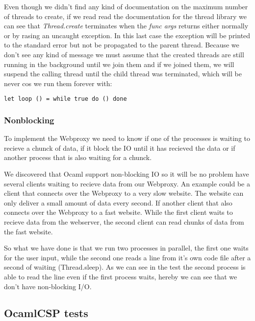 \documentclass[a4paper,12pt]{article}
\begin{document}
Even though we didn't find any kind of documentation on the maximum number
of threads to create, if we read read the documentation for the thread library
we can see that {\it Thread.create} terminates when the {\it func args}
returns either normally or by rasing an uncaught exception. In this last case
the exception will be printed to the standard error but not be propagated to
the parent thread. Because we don't see any kind of message we must assume
that the created threads are still running in the background until we join
them and if we joined them, we will suspend the calling thread until the
child thread was terminated, which will be never cos we run them forever with:
\begin{verbatim}
let loop () = while true do () done
\end{verbatim}

\subsubsection{Nonblocking}
To implement the Webproxy we need to know if one of the processes is waiting
to recieve a chunck of data, if it block the IO until it has recieved the data
or if another process that is also waiting for a chunck.

We discovered that Ocaml support non-blocking IO so it will be no problem have
several clients waiting to recieve data from our Webproxy. An example could
be a client that connects over the Webproxy to a very slow website. The website
can only deliver a small amount of data every second. If another client that
also connects over the Webproxy to a fast website. While the first client
waits to recieve data from the webserver, the second client can read chunks
of data from the fast website.

So what we have done is that we run two processes in parallel, the first one
waits for the user input, while the second one reads a line from it's own
code file after a second of waiting (Thread.sleep). As we can see in the test
the second process is able to read the line even if the first process waits,
hereby we can see that we don't have non-blocking I/O.

\subsection{OcamlCSP tests}
\label{ocamlcsptests}
\end{document}
